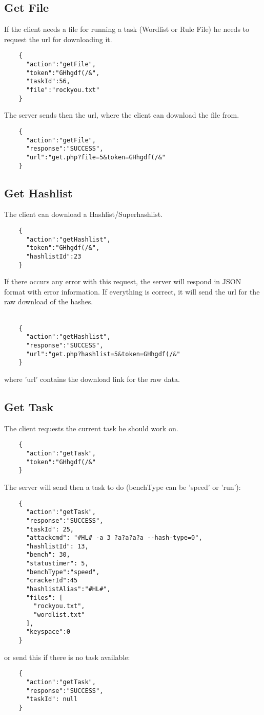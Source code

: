 \documentclass{article}
\begin{document}
	\subsection*{Get File}
	If the client needs a file for running a task (Wordlist or Rule File) he needs to request the url for downloading it.
	\begin{verbatim}
	{
	  "action":"getFile",
	  "token":"GHhgdf(/&",
	  "taskId":56,
	  "file":"rockyou.txt"
	}
	\end{verbatim}
	The server sends then the url, where the client can download the file from.
	\begin{verbatim}
	{
	  "action":"getFile",
	  "response":"SUCCESS",
	  "url":"get.php?file=5&token=GHhgdf(/&"
	}
	\end{verbatim}
	
	\subsection*{Get Hashlist}
	The client can download a Hashlist/Superhashlist.
	\begin{verbatim}
	{
	  "action":"getHashlist",
	  "token":"GHhgdf(/&",
	  "hashlistId":23
	}
	\end{verbatim}
	If there occurs any error with this request, the server will respond in JSON format with error information. If everything is correct, it will send the url for the raw download of the hashes.\\\\
	\begin{verbatim}
	{
	  "action":"getHashlist",
	  "response":"SUCCESS",
	  "url":"get.php?hashlist=5&token=GHhgdf(/&"
	}
	\end{verbatim}
	where 'url' contains the download link for the raw data.
	
	\subsection*{Get Task}
	The client requests the current task he should work on.
	\begin{verbatim}
	{
	  "action":"getTask",
	  "token":"GHhgdf(/&"
	}
	\end{verbatim}
	The server will send then a task to do (benchType can be 'speed' or 'run'):
	\begin{verbatim}
	{
	  "action":"getTask",
	  "response":"SUCCESS",
	  "taskId": 25,
	  "attackcmd": "#HL# -a 3 ?a?a?a?a --hash-type=0",
	  "hashlistId": 13,
	  "bench": 30,
	  "statustimer": 5,
	  "benchType":"speed",
	  "crackerId":45
	  "hashlistAlias":"#HL#",
	  "files": [
	    "rockyou.txt",
	    "wordlist.txt"
	  ],
	  "keyspace":0
	}
	\end{verbatim}
	or send this if there is no task available:
	\begin{verbatim}
	{
	  "action":"getTask",
	  "response":"SUCCESS",
	  "taskId": null
	}
	\end{verbatim}
	
\end{document}
